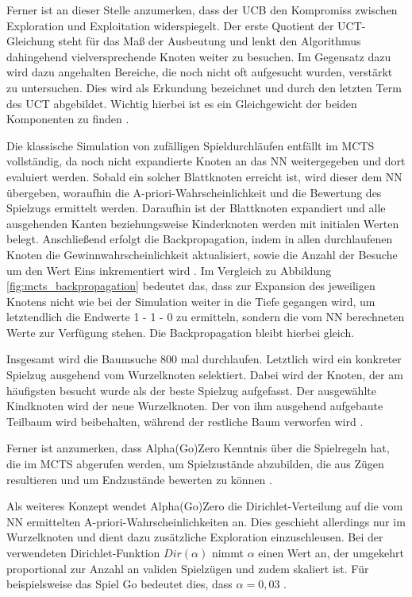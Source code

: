 \documentclass[12pt,a4paper]{article}
\begin{document}
Ferner ist an dieser Stelle anzumerken, dass der UCB den Kompromiss zwischen Exploration und Exploitation widerspiegelt. Der erste Quotient der UCT-Gleichung steht für das Maß der Ausbeutung und lenkt den Algorithmus dahingehend vielversprechende Knoten weiter zu besuchen. Im Gegensatz dazu wird dazu angehalten Bereiche, die noch nicht oft aufgesucht wurden, verstärkt zu untersuchen. Dies wird als Erkundung bezeichnet und durch den letzten Term des UCT abgebildet. Wichtig hierbei ist es ein Gleichgewicht der beiden Komponenten zu finden \cite{Browne2012}.

Die klassische Simulation von zufälligen Spieldurchläufen entfällt im MCTS vollständig, da noch nicht expandierte Knoten an das NN weitergegeben und dort evaluiert werden. Sobald ein solcher Blattknoten erreicht ist, wird dieser dem NN übergeben, woraufhin die A-priori-Wahrscheinlichkeit und die Bewertung des Spielzugs ermittelt werden. Daraufhin ist der Blattknoten expandiert und alle ausgehenden Kanten beziehungsweise Kinderknoten werden mit initialen Werten belegt.
Anschließend erfolgt die Backpropagation, indem in allen durchlaufenen Knoten die Gewinnwahrscheinlichkeit aktualisiert, sowie die Anzahl der Besuche um den Wert Eins inkrementiert wird \cite{Silver2017}. Im Vergleich zu Abbildung \ref{fig:mcts_backpropagation} bedeutet das, dass zur Expansion des jeweiligen Knotens nicht wie bei der Simulation weiter in die Tiefe gegangen wird, um letztendlich die Endwerte \glqq{}1\grqq{} - \glqq{}1\grqq{} - \glqq{}0\grqq{} zu ermitteln, sondern die vom NN berechneten Werte zur Verfügung stehen. Die Backpropagation bleibt hierbei gleich.

Insgesamt wird die Baumsuche 800 mal durchlaufen\cite{SilverHubert2017}. Letztlich wird ein konkreter Spielzug ausgehend vom Wurzelknoten selektiert. Dabei wird der Knoten, der am häufigsten besucht wurde als der beste Spielzug aufgefasst. Der ausgewählte Kindknoten wird der neue Wurzelknoten. Der von ihm ausgehend aufgebaute Teilbaum wird beibehalten, während der restliche Baum verworfen wird \cite{Silver2017}.

Ferner ist anzumerken, dass Alpha(Go)Zero Kenntnis über die Spielregeln hat, die im MCTS abgerufen werden, um Spielzustände abzubilden, die aus Zügen resultieren und um Endzustände bewerten zu können \cite{Silver2017} \cite{SilverHubert2017}. 

Als weiteres Konzept wendet Alpha(Go)Zero die Dirichlet-Verteilung auf die vom NN ermittelten A-priori-Wahrscheinlichkeiten an. Dies geschieht allerdings nur im Wurzelknoten und dient dazu zusätzliche Exploration einzuschleusen. Bei der verwendeten Dirichlet-Funktion $Dir(\alpha)$ nimmt $\alpha$ einen Wert an, der umgekehrt proportional zur Anzahl an validen Spielzügen und zudem skaliert ist. Für beispielsweise das Spiel Go bedeutet dies, dass $\alpha = 0,03$ \cite{SilverHubert2017}. 
\end{document}
